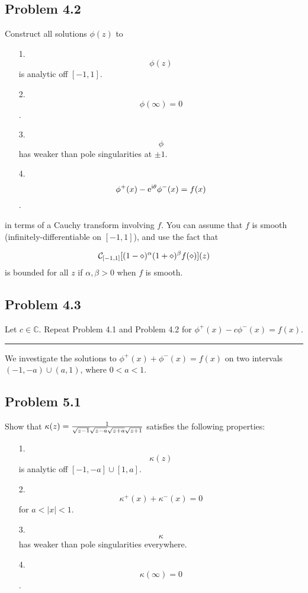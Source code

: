 \documentclass[12pt,a4paper]{article}
\def\I{ {\rm i} }
\def\E{ {\rm e} }
\def\C{ {\mathbb C} }
\def\CC{ {\cal C} }
\begin{document}
\subsection{Problem 4.2}
Construct all solutions $\phi(z)$  to

\begin{itemize}
\item[1. ] \[
\phi(z)
\]
is analytic off $[-1,1]$.


\item[2. ] \[
\phi(\infty) = 0
\]
.


\item[3. ] \[
\phi
\]
has weaker than pole singularities at $\pm 1$.


\item[4. ] \[
\phi^+(x) - \E^{\I \theta} \phi^-(x) = f(x)
\]
.

\end{itemize}
in terms of a Cauchy transform involving $f$. You can assume that $f$ is smooth (infinitely-differentiable on $[-1,1]$), and use the fact that

\[
\CC_{[-1,1]} [(1-\diamond)^\alpha (1+\diamond)^\beta f(\diamond) ](z)
\]
is bounded for all $z$ if $\alpha, \beta > 0$ when $f$ is smooth.

\subsection{Problem 4.3}
Let $c \in \C$. Repeat Problem 4.1 and Problem 4.2 for $\phi^+(x) - c \phi^-(x) = f(x)$.

\rule{\textwidth}{1pt}
We investigate the solutions to  $\phi^+(x) + \phi^-(x) = f(x)$ on two intervals $(-1,-a) \cup (a, 1)$, where $0 < a < 1$.

\subsection{Problem 5.1}
Show that $\kappa(z) = {1 \over \sqrt{z-1} \sqrt{z-a} \sqrt{z+a} \sqrt{z+1}}$ satisfies the following properties:

\begin{itemize}
\item[1. ] \[
\kappa(z)
\]
is analytic off $[-1,-a] \cup [1,a]$.


\item[2. ] \[
\kappa^+(x) + \kappa^-(x) = 0
\]
for $a < |x| < 1$.


\item[3. ] \[
\kappa
\]
has weaker than pole singularities everywhere.


\item[4. ] \[
\kappa(\infty) = 0
\]
.

\end{itemize}
\end{document}

